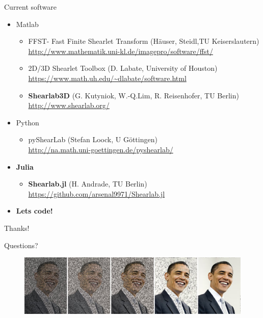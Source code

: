 \begin{frame}{Current software}
\begin{itemize}
\item{Matlab}
\begin{itemize}
	\item FFST- Fast Finite Shearlet Transform (H\"auser, Steidl,TU Keiserslautern)\\ \url{http://www.mathematik.uni-kl.de/imagepro/software/ffst/}
	\item 2D/3D Shearlet Toolbox (D. Labate, University of Houston)\\ \url{https://www.math.uh.edu/~dlabate/software.html}
	\item \textbf{Shearlab3D} (G. Kutyniok, W.-Q.Lim, R. Reisenhofer, TU Berlin)\\\url{http://www.shearlab.org/}
\end{itemize}

\item{Python}
\begin{itemize}
	\item pyShearLab (Stefan Loock, U G\"ottingen) \\ \url{http://na.math.uni-goettingen.de/pyshearlab/}
\end{itemize}

\item{\textbf{Julia}}
\begin{itemize}
\item \textbf{Shearlab.jl} (H. Andrade, TU Berlin) \\ \url{https://github.com/arsenal9971/Shearlab.jl}
\end{itemize}

\pause

\item \textbf{Lets code!}
\end{itemize}
\end{frame}

\begin{frame}{Thanks!}
\begin{center}
\Large{Questions?}
\end{center}
\begin{figure}[h!]
\centering
\includegraphics[width=1\textwidth]{./Images/obama_compressed.jpg}
\end{figure}
\end{frame}

